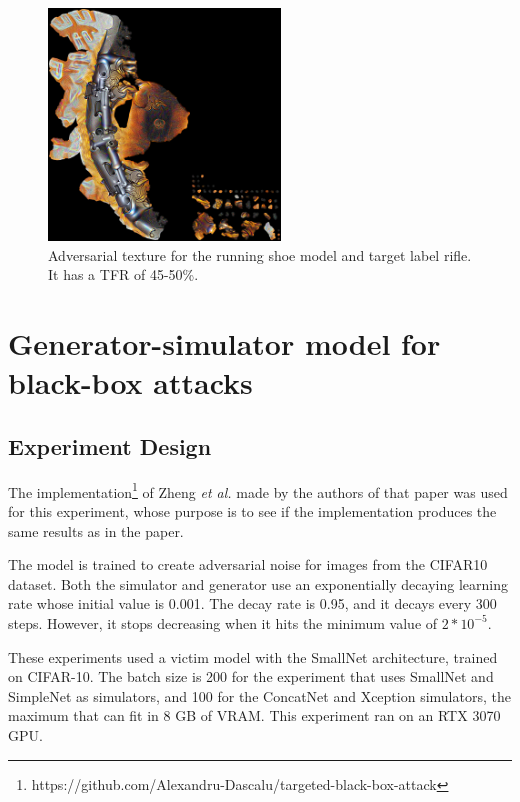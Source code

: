 \begin{figure}[H]
    \centering
    \includegraphics[width=0.55\textwidth]{graphics/running shoe rifle.jpg}
    \caption[Adversarial texture for the running shoe model and target label rifle.]{Adversarial texture for the running shoe model and target label rifle. It has a TFR of 45-50\%.}
    \label{fig:running_shoe_rifle}
\end{figure}

\section{Generator-simulator model for black-box attacks}

\subsection{Experiment Design}

The implementation\footnote{https://github.com/Alexandru-Dascalu/targeted-black-box-attack} of Zheng \textit{et al.} \cite{zheng_black_box_GAN} made by the authors of that paper was used for this experiment, whose purpose is to see if the implementation produces the same results as in the paper. 

The model is trained to create adversarial noise for images from the CIFAR10 dataset. Both the simulator and generator use an exponentially decaying learning rate whose initial value is 0.001. The decay rate is 0.95, and it decays every 300 steps. However, it stops decreasing when it hits the minimum value of $2 * 10^{-5}$. 

These experiments used a victim model with the SmallNet architecture, trained on CIFAR-10. The batch size is 200 for the experiment that uses SmallNet and SimpleNet as simulators, and 100 for the ConcatNet and Xception simulators, the maximum that can fit in 8 GB of VRAM. This experiment ran on an RTX 3070 GPU.

